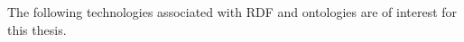 The following technologies associated with \gls{RDF} and ontologies
are of interest for this thesis.
%    
%    
%    

